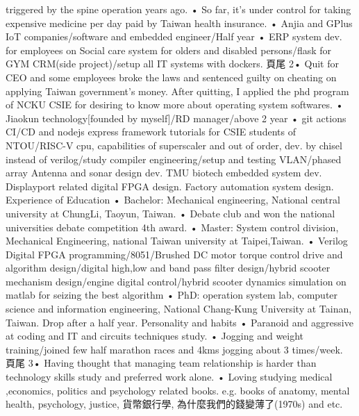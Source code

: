 triggered by the spine operation years ago.
• So far, it’s under control for taking expensive medicine per day paid by Taiwan
health insurance.
• Anjia and GPlus IoT companies/software and embedded engineer/Half year
• ERP system dev. for employees on Social care system for olders and disabled
persons/flask for GYM CRM(side project)/setup all IT systems with dockers.
⾴尾 2• Quit for CEO and some employees broke the laws and sentenced guilty on
cheating on applying Taiwan government’s money. After quitting, I applied the
phd program of NCKU CSIE for desiring to know more about operating system
softwares.
• Jiaokun technology[founded by myself]/RD manager/above 2 year
• git actions CI/CD and nodejs express framework tutorials for CSIE students of
NTOU/RISC-V cpu, capabilities of superscaler and out of order, dev. by chisel
instead of verilog/study compiler engineering/setup and testing VLAN/phased
array Antenna and sonar design dev. TMU biotech embedded system dev.
Displayport related digital FPGA design. Factory automation system design.
Experience of Education
• Bachelor: Mechanical engineering, National central university at ChungLi,
Taoyun, Taiwan.
• Debate club and won the national universities debate competition 4th award.
• Master: System control division, Mechanical Engineering, national Taiwan
university at Taipei,Taiwan.
• Verilog Digital FPGA programming/8051/Brushed DC motor torque control
drive and algorithm design/digital high,low and band pass filter design/hybrid
scooter mechanism design/engine digital control/hybrid scooter dynamics
simulation on matlab for seizing the best algorithm
• PhD: operation system lab, computer science and information engineering,
National Chang-Kung University at Tainan, Taiwan. Drop after a half year.
Personality and habits
• Paranoid and aggressive at coding and IT and circuits techniques study.
• Jogging and weight training/joined few half marathon races and 4kms jogging
about 3 times/week.
⾴尾 3• Having thought that managing team relationship is harder than technology skills
study and preferred work alone.
• Loving studying medical ,economics, politics and psychology related books.
e.g. books of anatomy, mental health, psychology, justice, 貨幣銀行學, 為什麼我們的錢變薄了(1970s) and etc.